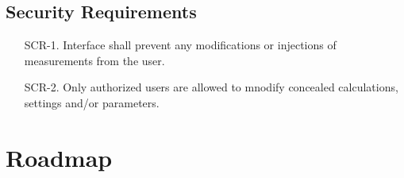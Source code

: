 \documentclass{article}
\begin{document}
\subsection*{Security Requirements}
\begin{enumerate}
  \item[SCR-1.] Interface shall prevent any modifications or injections of measurements from the user.
  \item[SCR-2.] Only authorized users are allowed to mnodify concealed calculations, settings and/or parameters.
\end{enumerate}

\section{Roadmap}

\end{document}

